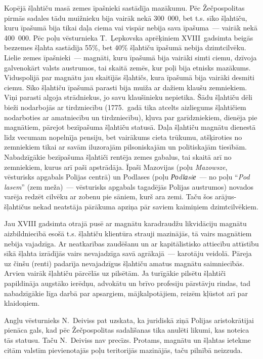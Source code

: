 \documentclass[twoside,a5paper,12pt,fleqn,openany]{extbook}
\newcommand{\pltxti}[1]{\textit{\textpolish{#1}}}
\begin{document}
Kopējā šļahtiču masā zemes īpašnieki sastādīja mazākumu. Pēc Žečpospolitas pirmās sadales tādu muižnieku bija vairāk nekā 300~000, bet t.s. sīko šļahtiču, kuru īpašumā bija tikai daļa ciema vai vispār nebija sava īpašuma~--- vairāk nekā 400~000. Pēc poļu vēsturnieka T.~Ļepkovska aprēķiniem XVIII~gadsimta beigās bezzemes šļahta sastādīja 55\%, bet 40\% šļahtiču īpašumā nebija dzimtcilvēku. Lielie zemes īpašnieki~--- magnāti, kuru īpašumā bija vairāki simti ciemu, dzīvoja galvenokārt valsts austrumos, tai skaitā zemēs, kur poļi bija etnisks mazākums. Viduspolijā par magnātu jau skaitījās šļahtičs, kura īpašumā bija vairāki desmiti ciemu. Sīko šļahtiču īpašumā parasti bija muiža ar dažiem klaušu zemniekiem. Viņi parasti algoja strādniekus, jo savu klaušinieku nepietika. Šādu šļahtiču dēli bieži nodarbojās ar tirdzniecību (1775.~gadā tika atcelts aizliegums šļahtičiem nodarboties ar amatniecību un tirdzniecību), kļuva par garīdzniekiem, dienēja pie magnātiem, pārejot bezīpašuma šļahtiču statusā. Daļa šļahtiču magnātu dienestā līdz vecumam nopelnīja pensiju, bet vairākums cieta trūkumu, atšķiroties no zemniekiem tikai ar savām iluzorajām pilsoniskajām un politiskajām tiesībām. Nabadzīgākie bezīpašuma šļahtiči rentēja zemes gabalus, tai skaitā arī no zemniekiem, kurus arī paši apstrādāja. Īpaši Mazovijas (poļu \pltxti{Mazowsze}, vēsturisks apgabals Polijas centrā) un Podlases (poļu \pltxti{Роdlаsiе}~--- no poļu ``\pltxti{Pod lasem}'' (zem meža)~--- vēsturisks apgabals tagadējās Polijas austrumos) novados varēja redzēt cilvēku ar zobenu pie sāniem, kurš ara zemi. Taču šos arājus-šļahtičus nekad neatstāja pārākuma apziņa pār saviem kaimiņiem dzimtcilvēkiem.

Jau XVIII gadsimta otrajā pusē ar magnātu karadraudžu likvidāciju magnātu aizbildniecībā esošā t.s. šļahtiču klientūra strauji mazinājās, tā vairs magnātiem nebija vajadzīga. Ar neatkarības zaudēšanu un ar kapitālistisko attiecību attīstību sīkā šļahta izrādījās vairs nevajadzīga savā agrākajā~--- karotāju veidolā. Pāreja uz činšu (renti) padarīja nevajadzīgus šļahtiču amatus magnātu saimniecībās. Arvien vairāk šļahtiču pārcēlās uz pilsētām. Ja turīgākie pilsētu šļahtiči papildināja augstāko ierēdņu, advokātu un brīvo profesiju pārstāvju rindas, tad nabadzīgākie līga darbā par apsargiem, mājkalpotājiem, reizēm kļūstot arī par klaidoņiem.

Angļu vēsturnieks N.~Deiviss pat uzskata, ka juridiskā ziņā Polijas aristokrātijai pienāca gals, kad pēc Žečpospolitas sadalīšanas tika anulēti likumi, kas noteica tās statusu. Taču N.~Deiviss nav precīzs. Protams, magnātu un šļahtas ietekme citām valstīm pievienotajās poļu teritorijās mazinājās, taču pilnībā neizzuda.
\end{document}

